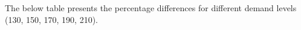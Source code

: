 The below table presents the percentage differences for different demand levels (130, 150, 170, 190, 210).



